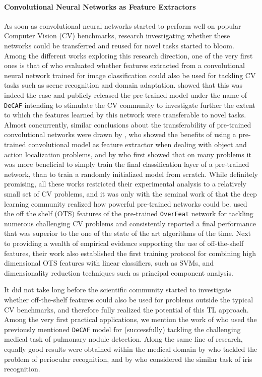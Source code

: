 \paragraph{\textbf{\uppercase{C}onvolutional \uppercase{N}eural \uppercase{N}etworks as \uppercase{F}eature Extractors}}
As soon as convolutional neural networks started to perform well on popular Computer Vision (CV) benchmarks, research investigating whether these networks could be transferred and reused for novel tasks started to bloom. Among the different works exploring this research direction, one of the very first ones is that of \citet{donahue2014decaf} who evaluated whether features extracted from a convolutional neural network trained for image classification could also be used for tackling CV tasks such as scene recognition and domain adaptation. \citet{donahue2014decaf} showed that this was indeed the case and publicly released the pre-trained model under the name of \texttt{DeCAF} intending to stimulate the CV community to investigate further the extent to which the features learned by this network were transferable to novel tasks. Almost concurrently, similar conclusions about the transferability of pre-trained convolutional networks were drawn by \citet{oquab2014learning}, who showed the benefits of using a pre-trained convolutional model as feature extractor when dealing with object and action localization problems, and by \citet{zeiler2014visualizing} who first showed that on many problems it was more beneficial to simply train the final classification layer of a pre-trained network, than to train a randomly initialized model from scratch. While definitely promising, all these works restricted their experimental analysis to a relatively small set of CV problems, and it was only with the seminal work of \citet{sharif2014cnn} that the deep learning community realized how powerful pre-trained networks could be. \citet{sharif2014cnn} used the off the shelf (OTS) features of the pre-trained \texttt{OverFeat} network \cite{sermanet2013overfeat} for tackling numerous challenging CV problems and consistently reported a final performance that was superior to the one of the state of the art algorithms of the time. Next to providing a wealth of empirical evidence supporting the use of off-the-shelf features, their work also established the first training protocol for combining high dimensional OTS features with linear classifiers, such as SVMs, and dimensionality reduction techniques such as principal component analysis. 

It did not take long before the scientific community started to investigate whether off-the-shelf features could also be used for problems outside the typical CV benchmarks, and therefore fully realized the potential of this TL approach. Among the very first practical applications, we mention the work of \citet{van2015off} who used the previously mentioned \texttt{DeCAF} model for (successfully) tackling the challenging medical task of pulmonary nodule detection. Along the same line of research, equally good results were obtained within the medical domain by \citet{hernandez2018periocular} who tackled the problem of periocular recognition, and by \citet{nguyen2017iris} who considered the similar task of iris recognition.

